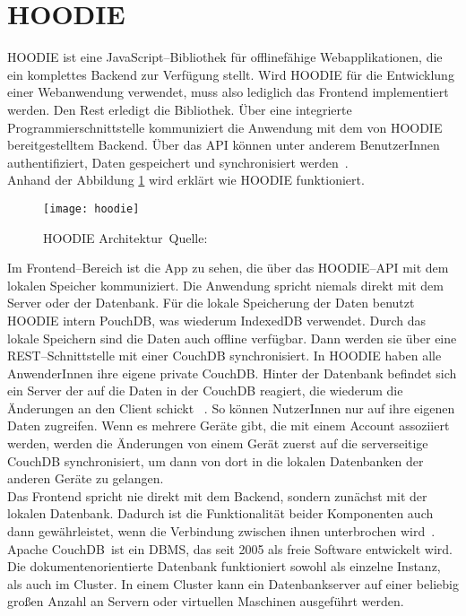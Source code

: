 \section{HOODIE}
HOODIE ist eine JavaScript--Bibliothek für offlinefähige Webapplikationen, die ein komplettes Backend zur Verfügung stellt.
Wird HOODIE für die Entwicklung einer Webanwendung verwendet, muss also lediglich das Frontend implementiert werden.
Den Rest erledigt die Bibliothek. Über eine integrierte Programmierschnittstelle kommuniziert die Anwendung mit dem von HOODIE bereitgestelltem Backend.
Über das \gls{API} können unter anderem BenutzerInnen authentifiziert, Daten gespeichert und synchronisiert werden~\cite{hoodie}.\\
Anhand der Abbildung \ref{fig:hoodie} wird erklärt wie HOODIE funktioniert.
%
\begin{figure}[H]
  \centering
  \texttt{[image: hoodie]}
  \grayRule
  \caption[HOODIE Architektur]{HOODIE Architektur~Quelle:~\cite{hoodie-how}}
  \label{fig:hoodie}
\end{figure}
%
Im Frontend--Bereich ist die App zu sehen, die über das HOODIE--\gls{API} mit dem lokalen Speicher kommuniziert.
Die Anwendung spricht niemals direkt mit dem Server oder der Datenbank.
Für die lokale Speicherung der Daten benutzt HOODIE intern PouchDB, was wiederum IndexedDB verwendet.
Durch das lokale Speichern sind die Daten auch offline verfügbar. Dann werden sie über eine \gls{REST}--Schnittstelle mit einer CouchDB synchronisiert.
In HOODIE haben alle AnwenderInnen ihre eigene private CouchDB.
Hinter der Datenbank befindet sich ein Server der auf die Daten in der CouchDB reagiert, die wiederum die Änderungen an den Client schickt ~\cite{hoodie-how}.
So können NutzerInnen nur auf ihre eigenen Daten zugreifen. Wenn es mehrere Geräte gibt, die mit einem Account assoziiert werden, werden die Änderungen von einem Gerät zuerst auf die serverseitige CouchDB synchronisiert, um dann von dort in die lokalen Datenbanken der anderen Geräte zu gelangen.\\
Das Frontend spricht nie direkt mit dem Backend, sondern zunächst mit der lokalen Datenbank.
Dadurch ist die Funktionalität beider Komponenten auch dann gewährleistet, wenn die Verbindung zwischen ihnen unterbrochen wird~\cite{hoodie-how}.
% 
% 
Apache CouchDB\tm ~ist ein \gls{DBMS}, das seit 2005 als freie Software entwickelt wird.
Die dokumentenorientierte Datenbank funktioniert sowohl als einzelne Instanz, als auch im Cluster.
In einem Cluster kann ein Datenbankserver auf einer beliebig großen Anzahl an Servern oder virtuellen Maschinen ausgeführt werden.\\
